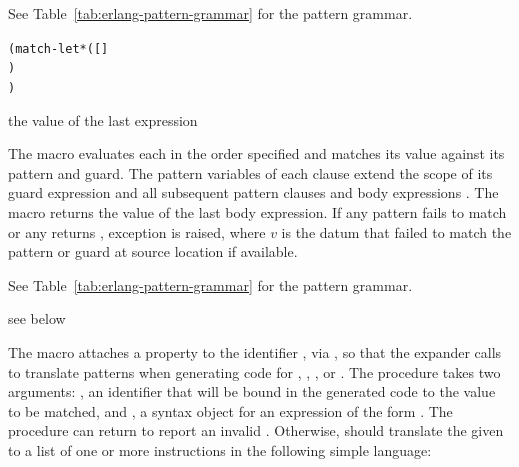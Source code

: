 See Table~\ref{tab:erlang-pattern-grammar} for the pattern grammar.

\begin{syntax}\begin{alltt}
(match-let* ([  ]
             \etc{})
    \etc{})\strut\end{alltt}
\end{syntax}
\returns{} the value of the last expression   \etc{}

The  macro evaluates each  in the order
specified and matches its value against its pattern and guard.  The
pattern variables of each clause extend the scope of its guard
expression  and all subsequent pattern clauses and body
expressions   \etc{}.  The  macro
returns the value of the last body expression.  If any pattern fails
to match or any  returns , exception
 is raised, where $v$ is the datum
that failed to match the pattern or guard at source location 
if available.

See Table~\ref{tab:erlang-pattern-grammar} for the pattern grammar.

\begin{syntax}
\end{syntax}
\expandsto{} see below

The  macro attaches a property
to the identifier , via ,
so that the expander calls  to translate
 patterns
when generating code for , , ,
or .
The  procedure takes two arguments: , an
identifier that will be bound in the generated code to the value to be
matched, and , a syntax object for an expression of the form
.
The  procedure can return  to report
an invalid .
Otherwise,  should translate the given  to
a list of one or more instructions in the following simple language:

